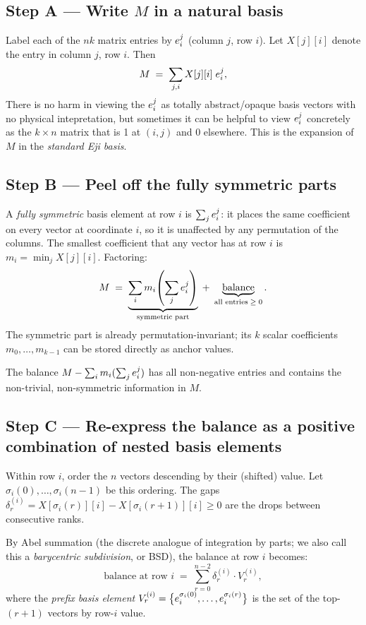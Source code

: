 \subsection*{Step A — Write $M$ in a natural basis}

Label each of the $nk$ matrix entries by $e^{j}_{i}$ (column $j$, row $i$).
Let $X[j][i]$ denote the entry in column $j$, row $i$.  Then
\[
  M \;=\; \sum_{j,i} X[j][i]\;e^{j}_{i},
\]
There is no harm in viewing the $e^{j}_{i}$ as totally abstract/opaque basis vectors with no physical intepretation, but sometimes it can be helpful to view $e^{j}_{i}$ concretely as the $k\times n$ matrix that is 1 at $(i,j)$ and 0
elsewhere.  This is the expansion of $M$ in the \emph{standard Eji basis}.

\subsection*{Step B — Peel off the fully symmetric parts}

A \emph{fully symmetric} basis element at row $i$ is $\sum_j e^{j}_{i}$: it
places the same coefficient on every vector at coordinate $i$, so it is
unaffected by any permutation of the columns.  The smallest coefficient that
any vector has at row $i$ is $m_i = \min_j X[j][i]$.  Factoring:
\[
  M \;=\; \underbrace{\sum_i m_i \!\left(\sum_j e^{j}_{i}\right)}_{\text{symmetric part}}
    \;+\; \underbrace{\text{balance}}_{\text{all entries} \;\ge\; 0}.
\]
The symmetric part is already permutation-invariant; its $k$ scalar
coefficients $m_0,\ldots,m_{k-1}$ can be stored directly as anchor values.

The balance $M - \sum_i m_i (\sum_j e^{j}_{i})$ has all non-negative
entries and contains the non-trivial, non-symmetric information in $M$.

\subsection*{Step C — Re-express the balance as a positive combination of
             nested basis elements}

Within row $i$, order the $n$ vectors descending by their (shifted) value.
Let $\sigma_i(0),\ldots,\sigma_i(n-1)$ be this ordering.  The gaps
$\delta^{(i)}_r = X[\sigma_i(r)][i] - X[\sigma_i(r+1)][i] \ge 0$ are the
drops between consecutive ranks.

By Abel summation (the discrete analogue of integration by parts; we also call
this a \emph{barycentric subdivision}, or BSD), the balance
at row $i$ becomes:
\[
  \text{balance at row }i
    \;=\; \sum_{r=0}^{n-2} \delta^{(i)}_r \cdot V^{(i)}_r,
\]
where the \emph{prefix basis element} $V^{(i)}_r =
\bigl\{e^{\sigma_i(0)}_{i},\ldots, e^{\sigma_i(r)}_{i}\bigr\}$
is the set of the top-$(r{+}1)$ vectors by row-$i$ value.

